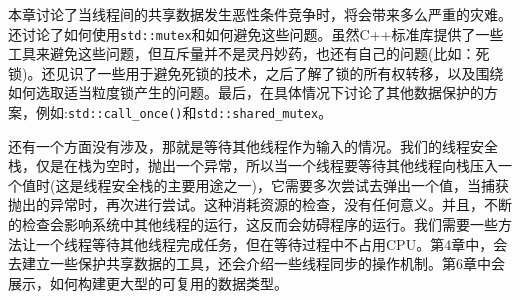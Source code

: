 
本章讨论了当线程间的共享数据发生恶性条件竞争时，将会带来多么严重的灾难。还讨论了如何使用\texttt{std::mutex}和如何避免这些问题。虽然C++标准库提供了一些工具来避免这些问题，但互斥量并不是灵丹妙药，也还有自己的问题(比如：死锁)。还见识了一些用于避免死锁的技术，之后了解了锁的所有权转移，以及围绕如何选取适当粒度锁产生的问题。最后，在具体情况下讨论了其他数据保护的方案，例如:\texttt{std::call\_once()}和\texttt{std::shared\_mutex}。

还有一个方面没有涉及，那就是等待其他线程作为输入的情况。我们的线程安全栈，仅是在栈为空时，抛出一个异常，所以当一个线程要等待其他线程向栈压入一个值时(这是线程安全栈的主要用途之一)，它需要多次尝试去弹出一个值，当捕获抛出的异常时，再次进行尝试。这种消耗资源的检查，没有任何意义。并且，不断的检查会影响系统中其他线程的运行，这反而会妨碍程序的运行。我们需要一些方法让一个线程等待其他线程完成任务，但在等待过程中不占用CPU。第4章中，会去建立一些保护共享数据的工具，还会介绍一些线程同步的操作机制。第6章中会展示，如何构建更大型的可复用的数据类型。